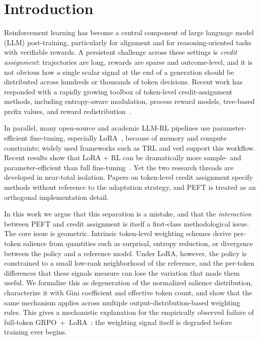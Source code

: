 \section{Introduction}

Reinforcement learning has become a central component of large language model
(LLM) post-training, particularly for alignment and for reasoning-oriented
tasks with verifiable rewards. A persistent challenge across these settings is
\emph{credit assignment}: trajectories are long, rewards are sparse and
outcome-level, and it is not obvious how a single scalar signal at the end of
a generation should be distributed across hundreds or thousands of token
decisions. Recent work has responded with a rapidly growing toolbox of
token-level credit-assignment methods, including entropy-aware modulation,
process reward models, tree-based prefix values, and reward
redistribution~\citep{cui2025prime,li2024red,tran2025tempo,wang2025beyond8020,he2026eapo,yu2026erpo,kazemnejad2024vineppo}.

In parallel, many open-source and academic LLM-RL pipelines use
parameter-efficient fine-tuning, especially LoRA~\citep{hu2021lora}, because of
memory and compute constraints; widely used frameworks such as TRL and verl
support this workflow. Recent results show that LoRA + RL can be dramatically
more sample- and parameter-efficient than full fine-tuning~\citep{wang2025tina}. Yet
the two research threads are developed in near-total isolation. Papers on
token-level credit assignment specify methods without reference to the
adaptation strategy, and PEFT is treated as an orthogonal implementation
detail.

In this work we argue that this separation is a mistake, and that the
\emph{interaction} between PEFT and credit assignment is itself a first-class
methodological issue. The core issue is geometric. Intrinsic token-level
weighting schemes derive per-token salience from quantities such as
surprisal, entropy reduction, or divergence between the policy and a reference
model. Under LoRA, however, the policy is constrained to a small low-rank
neighborhood of the reference, and the per-token differences that these
signals measure can lose the variation that made them useful. We formalize
this as degeneration of the normalized salience distribution, characterize it
with Gini coefficient and effective token count, and
show that the same mechanism applies across multiple
output-distribution-based weighting rules. This gives a mechanistic
explanation for the empirically observed failure of full-token
GRPO~+~LoRA~\citep{lee2025tokenefficientrl}: the weighting signal itself is
degraded before training ever begins.

